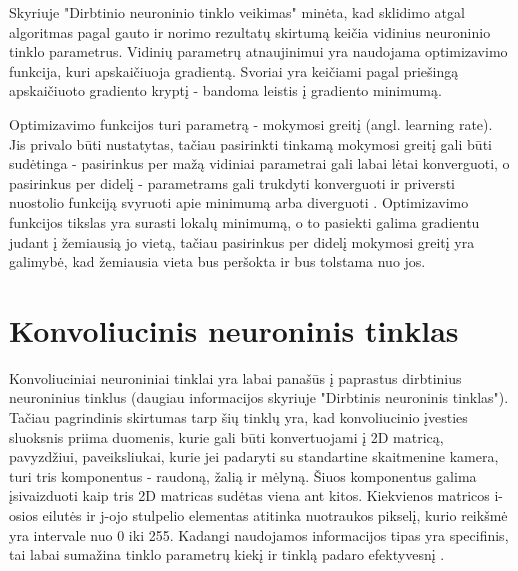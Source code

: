 \documentclass{VUMIFPSkursinis}
\begin{document}
Skyriuje "Dirbtinio neuroninio tinklo veikimas" minėta, kad sklidimo atgal algoritmas pagal gauto ir norimo 
rezultatų skirtumą keičia vidinius neuroninio tinklo parametrus. Vidinių parametrų atnaujinimui yra naudojama 
optimizavimo funkcija, kuri apskaičiuoja gradientą. Svoriai yra keičiami pagal priešingą apskaičiuoto gradiento 
kryptį - bandoma leistis į gradiento minimumą.

Optimizavimo funkcijos turi parametrą - mokymosi greitį (angl. learning rate). Jis privalo būti nustatytas, tačiau 
pasirinkti tinkamą mokymosi greitį gali būti sudėtinga - pasirinkus per mažą vidiniai parametrai gali labai lėtai 
konverguoti, o pasirinkus per didelį - parametrams gali trukdyti konverguoti ir priversti nuostolio funkciją svyruoti
apie minimumą arba diverguoti \cite{leondes1998image}. Optimizavimo funkcijos tikslas yra surasti lokalų minimumą, 
o to pasiekti galima gradientu judant į žemiausią jo vietą, tačiau pasirinkus per didelį mokymosi greitį yra galimybė, 
kad žemiausia vieta bus peršokta ir bus tolstama nuo jos.




\section{Konvoliucinis neuroninis tinklas}
Konvoliuciniai neuroniniai tinklai yra labai panašūs į paprastus dirbtinius neuroninius tinklus (daugiau informacijos skyriuje "Dirbtinis neuroninis
tinklas"). Tačiau pagrindinis skirtumas tarp šių tinklų yra, kad konvoliucinio įvesties sluoksnis priima duomenis, kurie gali būti konvertuojami į 2D matricą, pavyzdžiui, paveiksliukai, 
kurie jei padaryti su standartine skaitmenine kamera, turi tris komponentus - raudoną, žalią ir mėlyną. Šiuos komponentus galima 
įsivaizduoti kaip tris 2D matricas sudėtas viena ant kitos. Kiekvienos matricos i-osios eilutės ir j-ojo stulpelio elementas 
atitinka nuotraukos pikselį, kurio reikšmė yra intervale nuo 0 iki 255. Kadangi naudojamos informacijos tipas yra specifinis, 
tai labai sumažina tinklo parametrų kiekį ir tinklą padaro efektyvesnį \cite{CnnImages}.
\end{document}

